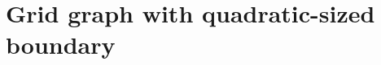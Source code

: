 \documentclass[11pt]{amsart}
\newcommand{\tp}[1]{{\left( #1 \right)}}
\newcommand{\abs}[1]{\ensuremath{\left\vert#1\right\vert}}
\theoremstyle{definition}
\theoremstyle{remark}
\begin{document}
%

\section{Grid graph with quadratic-sized boundary}\label{sec:quadratic-boundary}
\end{document}
